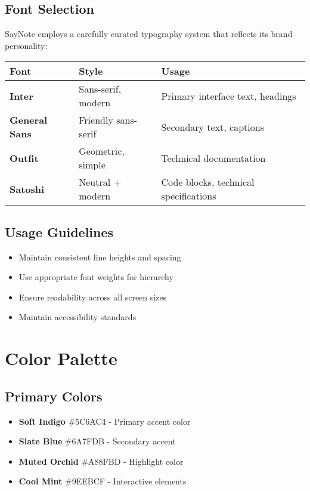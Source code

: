 \subsection{Font Selection}
SayNote employs a carefully curated typography system that reflects its brand personality:
\begin{tabular}{|l|l|l|}
\hline
\textbf{Font} & \textbf{Style} & \textbf{Usage} \\
\hline
\textbf{Inter} & Sans-serif, modern & Primary interface text, headings \\
\hline
\textbf{General Sans} & Friendly sans-serif & Secondary text, captions \\
\hline
\textbf{Outfit} & Geometric, simple & Technical documentation \\
\hline
\textbf{Satoshi} & Neutral + modern & Code blocks, technical specifications \\
\hline
\end{tabular}

\subsection{Usage Guidelines}
\begin{itemize}
    \item Maintain consistent line heights and spacing
    \item Use appropriate font weights for hierarchy
    \item Ensure readability across all screen sizes
    \item Maintain accessibility standards
\end{itemize}

\section{Color Palette}
\subsection{Primary Colors}
\begin{itemize}
    \item \textbf{Soft Indigo} \#5C6AC4 - Primary accent color
    \item \textbf{Slate Blue} \#6A7FDB - Secondary accent
    \item \textbf{Muted Orchid} \#A88FBD - Highlight color
    \item \textbf{Cool Mint} \#9EEBCF - Interactive elements
\end{itemize}

